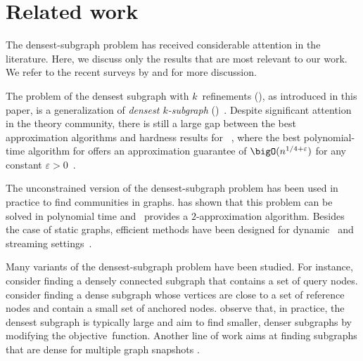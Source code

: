 \section{Related work}
\label{sec:related}

The densest-subgraph problem has received considerable attention in the literature. Here, we discuss only the results that are most relevant to our work. 
We refer to the recent surveys by \citet{lanciano2023survey} and \citet{luo2023survey} for more discussion.

The problem of the densest subgraph with $k$~refinements (\dskc), as introduced in this paper, is a generalization of \emph{densest $k$-subgraph} (\dks)~\citep{DBLP:conf/focs/KortsarzP93}.
Despite significant attention in the theory community, there is still a large gap between the best approximation algorithms and hardness results for 
\dks~\citep{%
DBLP:journals/dam/AsahiroHI02,%
DBLP:conf/stoc/Barman15,%
DBLP:conf/stoc/BhaskaraCCFV10,%
DBLP:conf/stoc/Feige02,%
DBLP:journals/algorithmica/FeigePK01,%
DBLP:conf/stoc/LeeG22,%
DBLP:journals/algorithms/Manurangsi18},
where the best polynomial-time algorithm for \dks offers an approximation guarantee of $\bigO(n^{1/4+\varepsilon})$ for any constant $\varepsilon >0$~\citep{DBLP:conf/stoc/BhaskaraCCFV10}.

The unconstrained version of the densest-subgraph problem has been used in practice to find communities in graphs. 
\citet{goldberg1984finding} has shown that this problem can be solved in polynomial
time and~\citet{charikar00approximation} provides a $2$-approximation algorithm.  
Besides the case of static graphs, efficient methods have been designed for  dynamic~\citep{bhattacharya2015space,sawlani2020near} and streaming settings~\citep{mcgregoar2015densest}.

Many variants of the densest-subgraph problem have been studied. For instance, \citet{sozio2010community} consider finding a densely connected subgraph that contains a set of query nodes.
\citet{dai2022anchored, ye2024efficient} consider finding a dense subgraph whose vertices are close to a set of reference nodes and contain a small set of anchored nodes.
\citet{tsourakakis2013denser} observe that, in practice, the densest subgraph is typically large and 
aim to find smaller, denser subgraphs by modifying the objective~function. 
Another line of work aims at finding subgraphs that are dense for multiple graph snap\-shots \citep{charikar2018finding,jethava2015finding,semertzidis2019finding}.

